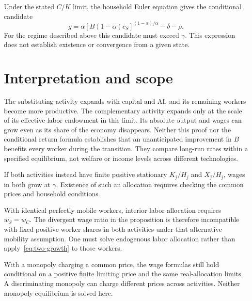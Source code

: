 \documentclass[11pt]{article}
\begin{document}
Under the stated $C/K$ limit, the household Euler equation gives the
conditional candidate
\[
 g=\alpha[B(1-\alpha)c_S]^{(1-\alpha)/\alpha}-\delta-\rho.
\]
For the regime described above this candidate must exceed $\gamma$.
This expression does not establish existence or convergence from a given state.

\section{Interpretation and scope}
The substituting activity expands with capital and AI, and its remaining
workers become more productive. The complementary activity expands only
at the scale of its effective labor endowment in this limit. Its absolute
output and wages can grow even as its share of the economy disappears.
Neither this proof nor the conditional return formula establishes that an
unanticipated improvement in $B$ benefits every worker during the transition.
They compare long-run rates within a specified equilibrium, not welfare or
income levels across different technologies.

If both activities instead have finite positive stationary $K_j/H_j$ and
$X_j/H_j$, wages in both grow at $\gamma$. Existence of such an allocation
requires checking the common prices and household conditions.

With identical perfectly mobile workers, interior labor allocation requires
$w_S=w_C$. The divergent wage ratio in the proposition is therefore
incompatible with fixed positive worker shares in both activities under that
alternative mobility assumption. One must solve endogenous labor allocation
rather than apply~\eqref{eq:two-growth} to those workers.

With a monopoly charging a common price, the wage formulas still hold
conditional on a positive finite limiting price and the same real-allocation
limits. A discriminating monopoly can charge different prices across
activities. Neither monopoly equilibrium is solved here.
\end{document}
